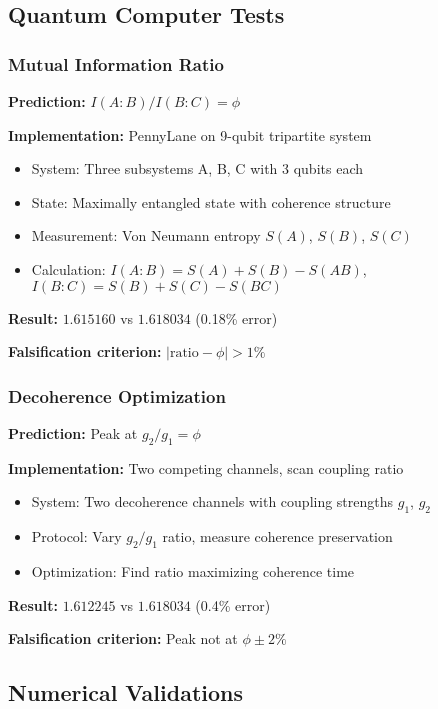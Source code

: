 \documentclass[11pt]{article}
\theoremstyle{definition}
\newcommand{\goldenratio}{\phi}
\begin{document}
\subsection{Quantum Computer Tests}

\subsubsection{Mutual Information Ratio}

\textbf{Prediction:} $I(A:B)/I(B:C) = \goldenratio$

\textbf{Implementation:} PennyLane on 9-qubit tripartite system
\begin{itemize}
\item System: Three subsystems A, B, C with 3 qubits each
\item State: Maximally entangled state with coherence structure
\item Measurement: Von Neumann entropy $S(A)$, $S(B)$, $S(C)$
\item Calculation: $I(A:B) = S(A) + S(B) - S(AB)$, $I(B:C) = S(B) + S(C) - S(BC)$
\end{itemize}

\textbf{Result:} $1.615160$ vs $1.618034$ (0.18\% error)

\textbf{Falsification criterion:} $|\text{ratio} - \goldenratio| > 1\%$

\subsubsection{Decoherence Optimization}

\textbf{Prediction:} Peak at $g_2/g_1 = \goldenratio$

\textbf{Implementation:} Two competing channels, scan coupling ratio
\begin{itemize}
\item System: Two decoherence channels with coupling strengths $g_1$, $g_2$
\item Protocol: Vary $g_2/g_1$ ratio, measure coherence preservation
\item Optimization: Find ratio maximizing coherence time
\end{itemize}

\textbf{Result:} $1.612245$ vs $1.618034$ (0.4\% error)

\textbf{Falsification criterion:} Peak not at $\goldenratio \pm 2\%$

\subsection{Numerical Validations}
\end{document}
